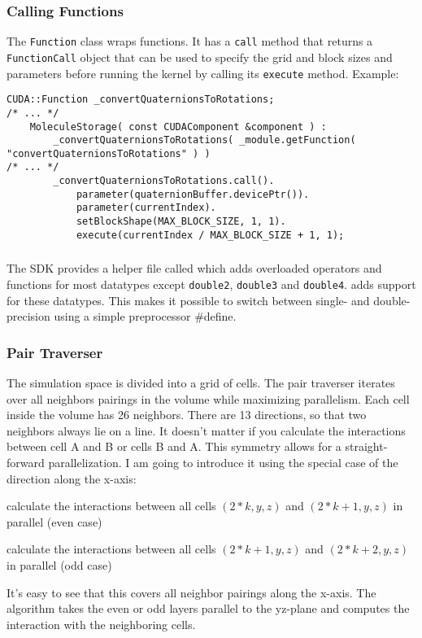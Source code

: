 \subsubsection{Calling \cuda{} Functions}
The \lstinline!Function! class wraps \cuda{} functions. It has a \lstinline!call! method that returns a \lstinline!FunctionCall! object that can be used to specify the grid and block sizes and parameters before running the \cuda{} kernel by calling its \lstinline!execute! method.
Example:
\begin{lstlisting}[label=cudafunctionhelpers,caption=CUDA helper classes for Function Calls]
	CUDA::Function _convertQuaternionsToRotations;
/* ... */		
	MoleculeStorage( const CUDAComponent &component ) :
		_convertQuaternionsToRotations( _module.getFunction( "convertQuaternionsToRotations" ) )
/* ... */
		_convertQuaternionsToRotations.call().
			parameter(quaternionBuffer.devicePtr()).
			parameter(currentIndex).
			setBlockShape(MAX_BLOCK_SIZE, 1, 1).
			execute(currentIndex / MAX_BLOCK_SIZE + 1, 1);
\end{lstlisting}

\subsubsection{}
The \cuda{} SDK provides a helper file called  which adds overloaded operators and functions for most \cuda{} datatypes except \lstinline!double2!, \lstinline!double3! and \lstinline!double4!.
 adds support for these datatypes.
This makes it possible to switch between single- and double-precision using a simple preprocessor \#define.

\subsubsection{Pair Traverser}
The simulation space is divided into a grid of cells.  The pair traverser iterates over all neighbors pairings in the volume while maximizing parallelism. Each cell inside the volume has 26 neighbors. There are 13 directions, so that two neighbors always lie on a line. It doesn't matter if you calculate the interactions between cell A and B or cells B and A. This symmetry allows for a straight-forward parallelization.
I am going to introduce it using the special case of the direction along the x-axis:
\begin{compactenum}
\item calculate the interactions between all cells $ \left ( 2*k, y, z \right ) $ and $ \left ( 2*k + 1, y, z \right ) $ in parallel (even case)
\item calculate the interactions between all cells $ \left ( 2*k + 1, y, z \right ) $ and $ \left ( 2*k + 2, y, z \right ) $ in parallel (odd case)
\end{compactenum}
It's easy to see that this covers all neighbor pairings along the x-axis. 
The algorithm takes the even or odd layers parallel to the yz-plane and computes the interaction with the neighboring cells.

